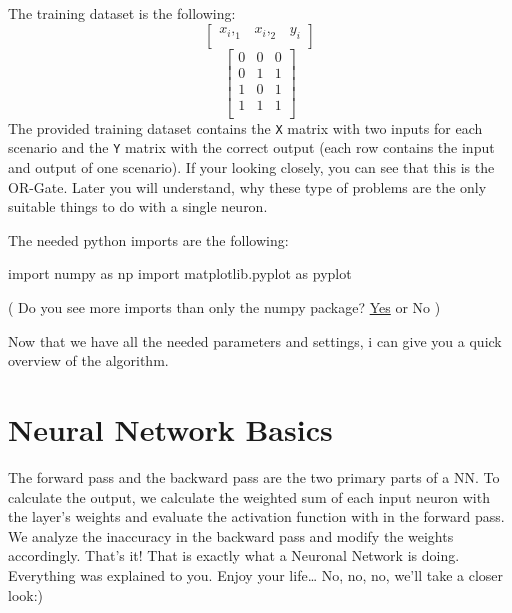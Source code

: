\documentclass[
]{book}
\newenvironment{Shaded}{\begin{snugshade}}{\end{snugshade}}
\newcommand{\ImportTok}[1]{#1}
\newcommand{\NormalTok}[1]{#1}
\begin{document}
The training dataset is the following:
\[
\left[
\begin{array}{cc|c}
x_i,_1 & x_i,_2 & y_i \\
\end{array}
\right]
\]
\[
\left[
\begin{array}{cc|c}
0 & 0 & 0 \\
0 & 1 & 1 \\
1 & 0 & 1 \\
1 & 1 & 1 \\
\end{array}
\right]
\]
The provided training dataset contains the \texttt{X} matrix with two inputs for each scenario and the \texttt{Y} matrix with the correct output (each row contains the input and output of one scenario). If your looking closely, you can see that this is the OR-Gate. Later you will understand, why these type of problems are the only suitable things to do with a single neuron.

The needed python imports are the following:

\begin{Shaded}
\begin{Highlighting}[]
\ImportTok{import}\NormalTok{ numpy }\ImportTok{as}\NormalTok{ np}
\ImportTok{import}\NormalTok{ matplotlib.pyplot }\ImportTok{as}\NormalTok{ pyplot}
\end{Highlighting}
\end{Shaded}

( Do you see more imports than only the numpy package? \href{https://www.youtube.com/watch?v=dQw4w9WgXcQ}{Yes} or No )

Now that we have all the needed parameters and settings, i can give you a quick overview of the algorithm.

\hypertarget{neural-network-basics}{%
\section{Neural Network Basics}\label{neural-network-basics}}

The forward pass and the backward pass are the two primary parts of a NN. To calculate the output, we calculate the weighted sum of each input neuron with the layer's weights and evaluate the activation function with in the forward pass. We analyze the inaccuracy in the backward pass and modify the weights accordingly. That's it! That is exactly what a Neuronal Network is doing. Everything was explained to you. Enjoy your life\ldots{}
No, no, no, we'll take a closer look:)
\end{document}
